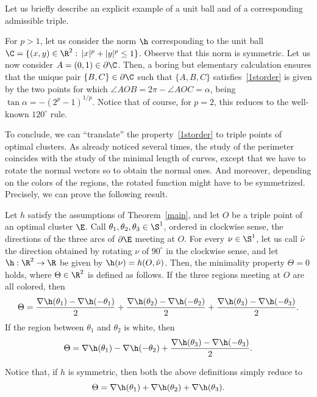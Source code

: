 Let us briefly describe an explicit example of a unit ball and of a corresponding admissible triple.
\begin{example}
For $p>1$, let us consider the norm $\h$ corresponding to the unit ball $\C=\{(x,y)\in\R^2:\, |x|^p +|y|^p\leq 1\}$. Observe that this norm is symmetric. Let us now consider $A=(0,1)\in\partial\C$. Then, a boring but elementary calculation ensures that the unique pair $\{B,C\}\in\partial\C$ such that $\{A,B,C\}$ satisfies~\eqref{1storder} is given by the two points for which $\angle AOB= 2\pi-\angle AOC= \alpha$, being $\tan\alpha= -(2^p-1)^{1/p}$. Notice that of course, for $p=2$, this reduces to the well-known $120^\circ$ rule.
\end{example}

To conclude, we can ``translate'' the property~\eqref{1storder} to triple points of optimal clusters. As already noticed several times, the study of the perimeter coincides with the study of the minimal length of curves, except that we have to rotate the normal vectors so to obtain the normal ones. And moreover, depending on the colors of the regions, the rotated function might have to be symmetrized. Precisely, we can prove the following result.
\begin{prop}
Let $h$ satisfy the assumptions of Theorem~\ref{main}, and let $O$ be a triple point of an optimal cluster $\E$. Call $\theta_1,\theta_2,\theta_3\in\S^1$, ordered in clockwise sense, the directions of the three arcs of $\partial\E$ meeting at $O$. For every $\nu\in\S^1$, let us call $\hat\nu$ the direction obtained by rotating $\nu$ of $90^\circ$ in the clockwise sense, and let $\h:\R^2\to\R$ be given by $\h(\nu)=h(O,\hat\nu)$. Then, the minimality property $\Theta=0$ holds, where $\Theta\in\R^2$ is defined as follows. If the three regions meeting at $O$ are all colored, then
\begin{equation}\label{321}
\Theta = \frac{\nabla\h(\theta_1)-\nabla\h(-\theta_1)}2+\frac{\nabla\h(\theta_2)-\nabla\h(-\theta_2)}2+\frac{\nabla\h(\theta_3)-\nabla\h(-\theta_3)}2.
\end{equation}
If the region between $\theta_1$ and $\theta_2$ is white, then
\begin{equation}\label{322}
\Theta = \nabla\h(\theta_1)-\nabla\h(-\theta_2)+\frac{\nabla\h(\theta_3)-\nabla\h(-\theta_3)}2.
\end{equation}
\end{prop}

Notice that, if $h$ is symmetric, then both the above definitions simply reduce to
\[
\Theta = \nabla\h(\theta_1)+\nabla\h(\theta_2)+\nabla\h(\theta_3).
\]

